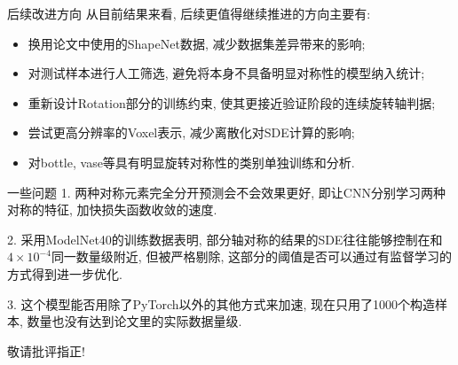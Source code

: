 \documentclass[UTF8, aspectratio=169, 11pt]{ctexbeamer}
\begin{document}
    \begin{frame}{后续改进方向}
        从目前结果来看, 后续更值得继续推进的方向主要有:
        \begin{itemize}
            \item 换用论文中使用的ShapeNet数据, 减少数据集差异带来的影响;
            \item 对测试样本进行人工筛选, 避免将本身不具备明显对称性的模型纳入统计;
            \item 重新设计Rotation部分的训练约束, 使其更接近验证阶段的连续旋转轴判据;
            \item 尝试更高分辨率的Voxel表示, 减少离散化对SDE计算的影响;
            \item 对bottle, vase等具有明显旋转对称性的类别单独训练和分析.
        \end{itemize}
    \end{frame}

    \begin{frame}{一些问题}
        1. 两种对称元素完全分开预测会不会效果更好, 即让CNN分别学习两种对称的特征, 加快损失函数收敛的速度.
        
        2. 采用ModelNet40的训练数据表明, 部分轴对称的结果的SDE往往能够控制在和$4\times 10^{-4}$同一数量级附近, 但被严格剔除, 这部分的阈值是否可以通过有监督学习的方式得到进一步优化.

        3. 这个模型能否用除了PyTorch以外的其他方式来加速, 现在只用了1000个构造样本, 数量也没有达到论文里的实际数据量级.
    \end{frame}

    \begin{frame}
        \centering
        \Huge 敬请批评指正!
    \end{frame}
\end{document}
